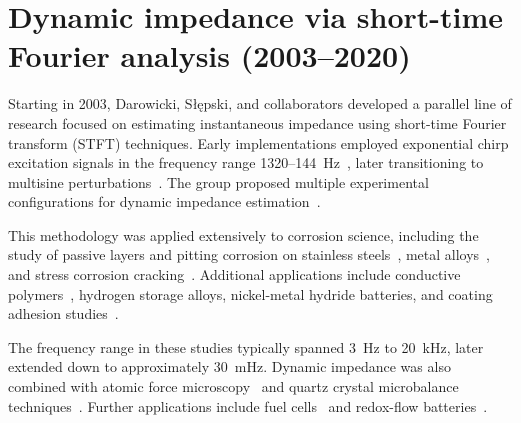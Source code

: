\section*{Dynamic impedance via short-time Fourier analysis (2003--2020)}

Starting in 2003, Darowicki, S\l{}ępski, and collaborators developed a parallel line of research focused on estimating instantaneous impedance using short-time Fourier transform (STFT) techniques.
Early implementations employed exponential chirp excitation signals in the frequency range 1320--144~Hz~\cite{darowickiDynamicElectrochemicalImpedance2003a, darowickiContinuousFrequencyMethodMeasurement2003}, later transitioning to multisine perturbations~\cite{darowickiInvestigationsPassiveLayer2003}.
The group proposed multiple experimental configurations for dynamic impedance estimation~\cite{darowickiInstantaneousElectrochemicalImpedance2004a}.

This methodology was applied extensively to corrosion science, including the study of passive layers and pitting corrosion on stainless steels~\cite{darowickiEvaluationPittingCorrosion2004a, darowickiTimeDependencePit2004, krakowiakImpedanceInvestigationPassive2005, krakowiakImpedanceMetastablePitting2005, orlikowskiInstantaneousImpedanceMonitoring2015, rylInstantaneousImpedanceMonitoring2016, orlikowskiDeterminationPittingCorrosion2017, naroznyApplicationElectrochemicalImpedance2018, darowickiNovelApplicationDynamic2020a, rylInstantaneousImpedanceAnalysis2017}, metal alloys~\cite{arutunowElectricalMechanicalCharacterization2015, zielinskiApplicationMultisineNanoscale2015, wysockaInvestigationElectrochemicalBehaviour2016, gawelImpedanceMonitoringCorrosion2017}, and stress corrosion cracking~\cite{darowickiDetectionStressCorrosion2004}.
Additional applications include conductive polymers~\cite{darowickiImpedanceCharacterizationProcess2004, darowickiDynamicElectrochemicalImpedance2004}, hydrogen storage alloys, nickel-metal hydride batteries, and coating adhesion studies~\cite{burczykLocalElectrochemicalImpedance2018}.

The frequency range in these studies typically spanned 3~Hz to 20~kHz, later extended down to approximately 30~mHz.
Dynamic impedance was also combined with atomic force microscopy~\cite{zielinskiMultifrequencyNanoscaleImpedance2019, rylStudySurfaceTermination2016} and quartz crystal microbalance techniques~\cite{parasinskaApplicationQuartzCrystal2024}.
Further applications include fuel cells~\cite{slepskiImpedanceMonitoringFuel2015, darowickiInfluenceDynamicLoad2019, darowickiImpedanceHydrogenOxidation2020a} and redox-flow batteries~\cite{krakowiakThreeModesElectrochemical2024}.

